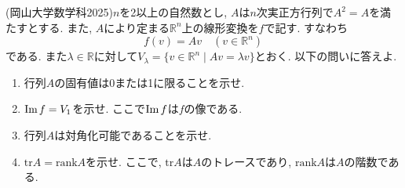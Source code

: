 \documentclass[a4j,dvipdfmx]{jsarticle}
\newcommand{\R}{\mathbb{R}}
\newcommand{\rank}{\mathrm{rank}}
\newcommand{\tr}{\mathrm{tr}}
\renewcommand{\Im}{\mathrm{Im}\hspace{0.5mm}}
\begin{document}
    \clearpage
    \begin{screen}
        (岡山大学数学科2025)$n$を2以上の自然数とし, $A$は$n$次実正方行列で$A^2=A$を満たすとする. また, $A$により定まる$\R^n$上の線形変換を$f$で記す. すなわち
        \begin{equation*}
            f(v)=Av\quad (v\in \R^n)
        \end{equation*}
        である. また$\lambda\in\R$に対して$V_\lambda = \{v\in\R^n\mid Av=\lambda v\}$とおく. 以下の問いに答えよ.
        \begin{enumerate}
            \item 行列$A$の固有値は0または1に限ることを示せ.
            \item $\Im f=V_1$を示せ. ここで$\Im f$は$f$の像である.
            \item 行列$A$は対角化可能であることを示せ.
            \item $\tr A=\rank A$を示せ. ここで, $\tr A$は$A$のトレースであり, $\rank A$は$A$の階数である.
        \end{enumerate}
    \end{screen}
\end{document}
